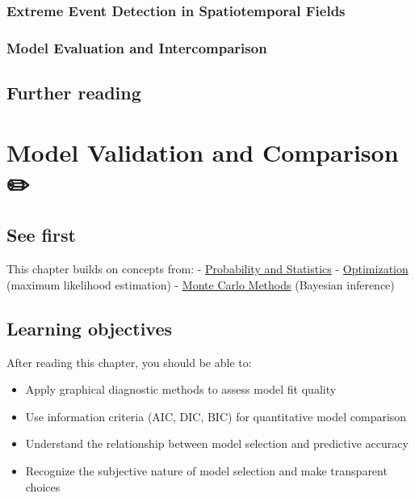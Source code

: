 \documentclass[
  letterpaper,
  DIV=11,
  numbers=noendperiod]{scrreprt}
\providecommand{\tightlist}{%
  \setlength{\itemsep}{0pt}\setlength{\parskip}{0pt}}
\begin{document}
\subsection{Extreme Event Detection in Spatiotemporal
Fields}\label{extreme-event-detection-in-spatiotemporal-fields}

\subsection{Model Evaluation and
Intercomparison}\label{model-evaluation-and-intercomparison}

\section*{Further reading}\label{further-reading-5}


\chapter{Model Validation and Comparison
✏️}\label{model-validation-and-comparison}

\section*{See first}\label{see-first-4}


This chapter builds on concepts from: -
\href{./chapters/fundamentals/probability-stats.qmd}{Probability and
Statistics} -
\href{./chapters/fundamentals/optimization.qmd}{Optimization} (maximum
likelihood estimation) -
\href{./chapters/fundamentals/monte-carlo.qmd}{Monte Carlo Methods}
(Bayesian inference)

\section*{Learning objectives}\label{learning-objectives-6}


After reading this chapter, you should be able to:

\begin{itemize}
\tightlist
\item
  Apply graphical diagnostic methods to assess model fit quality
\item
  Use information criteria (AIC, DIC, BIC) for quantitative model
  comparison
\item
  Understand the relationship between model selection and predictive
  accuracy
\item
  Recognize the subjective nature of model selection and make
  transparent choices
\end{itemize}
\end{document}
